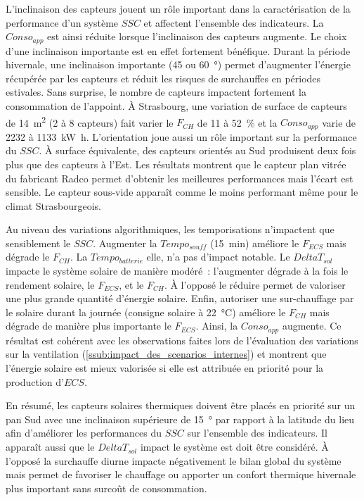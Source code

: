 L’inclinaison des capteurs jouent un rôle important dans la caractérisation de la
performance d’un système $SSC$ et affectent l’ensemble des indicateurs. La $Conso_{app}$
est ainsi réduite lorsque l’inclinaison des capteurs augmente. Le choix d’une inclinaison
importante est en effet fortement bénéfique. Durant la période hivernale, une inclinaison
importante (\num{45} ou \SI{60}{\degree}) permet d’augmenter l’énergie récupérée par les
capteurs et réduit les risques de surchauffes en périodes estivales. Sans surprise, le
nombre de capteurs impactent fortement la consommation de l’appoint. À Strasbourg, une
variation de surface de capteurs de \SI{14}{\meter\squared} (\num{2} à \num{8} capteurs)
fait varier le $F_{CH}$ de \num{11} à \SI{52}{\percent} et la $Conso_{app}$ varie de
\num{2232} à \SI{1133}{\kilo\watt\hour}. L’orientation joue aussi un rôle important sur la
performance du $SSC$. À surface équivalente, des capteurs orientés au Sud produisent deux
fois plus que des capteurs à l’Est. Les résultats montrent que le capteur plan vitrée du
fabricant Radco permet d’obtenir les meilleures performances mais l’écart est sensible. Le
capteur sous-vide apparaît comme le moins performant même pour le climat Strasbourgeois.

Au niveau des variations algorithmiques, les temporisations n’impactent que sensiblement
le $SSC$. Augmenter la $Tempo_{souff}$ (\SI{15}{min}) améliore le $F_{ECS}$ mais dégrade
le $F_{CH}$. La $Tempo_{batterie}$ elle, n’a pas d’impact notable. Le $DeltaT_{sol}$
impacte le système solaire de manière modéré~: l’augmenter dégrade à la fois le rendement
solaire, le $F_{ECS}$, et le $F_{CH}$. À l’opposé le réduire permet de valoriser une plus
grande quantité d’énergie solaire. Enfin, autoriser une sur-chauffage par le solaire
durant la journée (consigne solaire à \SI{22}{\celsius}) améliore le $F_{CH}$ mais dégrade
de manière plus importante le $F_{ECS}$. Ainsi, la $Conso_{app}$ augmente. Ce résultat est
cohérent avec les observations faites lors de l’évaluation des variations sur la
ventilation (\ref{ssub:impact_des_scenarios_internes}) et montrent que l’énergie solaire
est mieux valorisée si elle est attribuée en priorité pour la production d’$ECS$.

En résumé, les capteurs solaires thermiques doivent être placés en priorité sur un pan Sud
avec une inclinaison supérieure de \SI{15}{\degree} par rapport à la latitude du lieu afin
d’améliorer les performances du $SSC$ sur l’ensemble des indicateurs. Il apparaît aussi
que le $DeltaT_{sol}$ impact le système est doit être considéré. À l’opposé la surchauffe
diurne impacte négativement le bilan global du système mais permet de favoriser le
chauffage ou apporter un confort thermique hivernale plus important sans surcoût de
consommation.





